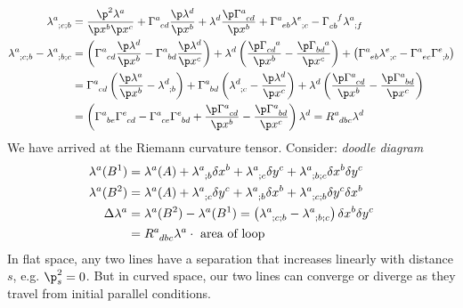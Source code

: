 \documentclass[a4paper, 11pt, normalem]{report}
\begin{document}
\begin{align}
    \tensor{\lambda}{^a_{;c;b}} &= \frac{\p^2\lambda^a}{\p x^b\p x^c} + \tensor{\Gamma}{^a_{cd}}\frac{\p\lambda^d}{\p x^b} + \lambda^d\frac{\p\tensor{\Gamma}{^a_{cd}}}{\p x^b} + \tensor{\Gamma}{^a_{eb}}\tensor{\lambda}{^e_{;c}} - \tensor{\Gamma}{_{cb}^f}\tensor{\lambda}{^a_{;f}} \\
    \tensor{\lambda}{^a_{;c;b}}-\tensor{\lambda}{^a_{;b;c}} &= \left(\tensor{\Gamma}{^a_{cd}}\frac{\p\lambda^d}{\p x^b} - \tensor{\Gamma}{^a_{bd}}\frac{\p\lambda^d}{\p x^c}\right) + \lambda^d\left(\frac{\p\tensor{\Gamma}{_{cd}^a}}{\p x^b} - \frac{\p\tensor{\Gamma}{_{bd}^a}}{\p x^c}\right) + \left(\tensor{\Gamma}{^a_{eb}}\tensor{\lambda}{^e_{;c}}-\tensor{\Gamma}{^a_{ec}}\tensor{\Gamma}{^e_{;b}}\right) \\
                                                            &= \tensor{\Gamma}{^a_{cd}}\left(\frac{\p\lambda^a}{\p x^b}-\tensor{\lambda}{^d_{;b}}\right) + \tensor{\Gamma}{^a_{bd}}\left(\tensor{\lambda}{^d_{;c}}-\frac{\p\lambda^d}{\p x^c}\right) + \lambda^d\left(\frac{\p\tensor{\Gamma}{^a_{cd}}}{\p x^b} - \frac{\p\tensor{\Gamma}{^a_{bd}}}{\p x^c}\right) \\
                                                            &= \left(\tensor{\Gamma}{^a_{be}}\tensor{\Gamma}{^e_{cd}} - \tensor{\Gamma}{^a_{ce}}\tensor{\Gamma}{^e_{bd}} + \frac{\p\tensor{\Gamma}{^a_{cd}}}{\p x^b} - \frac{\p\tensor{\Gamma}{^a_{bd}}}{\p x^c}\right)\lambda^d = \tensor{R}{^a_{dbc}}\lambda^d
\end{align}
We have arrived at the Riemann curvature tensor.
Consider:
\textit{doodle diagram}
\begin{align}
    \lambda^a(B^1) &= \lambda^a(A) + \tensor{\lambda}{^a_{;b}}\delta x^b + \tensor{\lambda}{^a_{;c}}\delta y^c + \tensor{\lambda}{^a_{;b;c}}\delta x^b\delta y^c \\
    \lambda^a(B^2) &= \lambda^a(A) + \tensor{\lambda}{^a_{;c}}\delta y^c + \tensor{\lambda}{^a_{;b}}\delta x^b + \tensor{\lambda}{^a_{;c;b}}\delta y^c\delta x^b \\
    \Delta\lambda^a &= \lambda^a(B^2)-\lambda^a(B^1) = \left(\tensor{\lambda}{^a_{;c;b}}-\tensor{\lambda}{^a_{;b;c}}\right)\delta x^b\delta y^c \\
                    &= \tensor{R}{^a_{dbc}}\lambda^a\cdot\text{ area of loop}
\end{align}
In flat space, any two lines have a separation that increases linearly with distance $s$, e.g. $\p_s^2=0$.
But in curved space, our two lines can converge or diverge as they travel from initial parallel conditions. 
\end{document}

